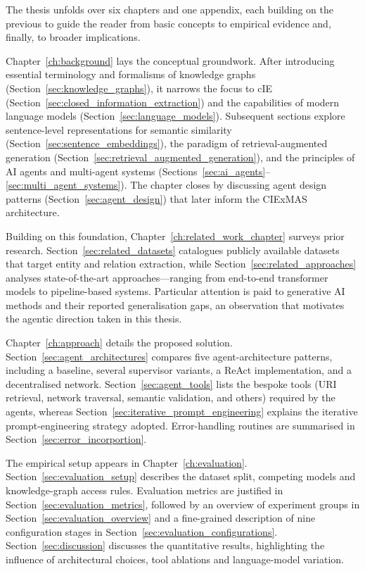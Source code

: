 \documentclass[a4paper,oneside,bibliography=totoc]{scrbook}
\begin{document}
The thesis unfolds over six chapters and one appendix, each building on the previous to guide the reader from basic concepts to empirical evidence and, finally, to broader implications.

Chapter~\ref{ch:background} lays the conceptual groundwork. After introducing essential terminology and formalisms of knowledge graphs (Section~\ref{sec:knowledge_graphs}), it narrows the focus to \ac{cIE} (Section~\ref{sec:closed_information_extraction}) and the capabilities of modern language models (Section~\ref{sec:language_models}). Subsequent sections explore sentence-level representations for semantic similarity (Section~\ref{sec:sentence_embeddings}), the paradigm of retrieval-augmented generation (Section~\ref{sec:retrieval_augmented_generation}), and the principles of AI agents and multi-agent systems (Sections~\ref{sec:ai_agents}–\ref{sec:multi_agent_systems}). The chapter closes by discussing agent design patterns (Section~\ref{sec:agent_design}) that later inform the CIExMAS architecture.

Building on this foundation, Chapter~\ref{ch:related_work_chapter} surveys prior research. Section~\ref{sec:related_datasets} catalogues publicly available datasets that target entity and relation extraction, while Section~\ref{sec:related_approaches} analyses state-of-the-art approaches—ranging from end-to-end transformer models to pipeline-based systems. Particular attention is paid to generative AI methods and their reported generalisation gaps, an observation that motivates the agentic direction taken in this thesis.

Chapter~\ref{ch:approach} details the proposed solution. Section~\ref{sec:agent_architectures} compares five agent-architecture patterns, including a baseline, several supervisor variants, a ReAct implementation, and a decentralised network. Section~\ref{sec:agent_tools} lists the bespoke tools (URI retrieval, network traversal, semantic validation, and others) required by the agents, whereas Section~\ref{sec:iterative_prompt_engineering} explains the iterative prompt-engineering strategy adopted. Error-handling routines are summarised in Section~\ref{sec:error_incorportion}.

The empirical setup appears in Chapter~\ref{ch:evaluation}. Section~\ref{sec:evaluation_setup} describes the dataset split, competing models and knowledge-graph access rules. Evaluation metrics are justified in Section~\ref{sec:evaluation_metrics}, followed by an overview of experiment groups in Section~\ref{sec:evaluation_overview} and a fine-grained description of nine configuration stages in Section~\ref{sec:evaluation_configurations}. Section~\ref{sec:discussion} discusses the quantitative results, highlighting the influence of architectural choices, tool ablations and language-model variation.
\end{document}
